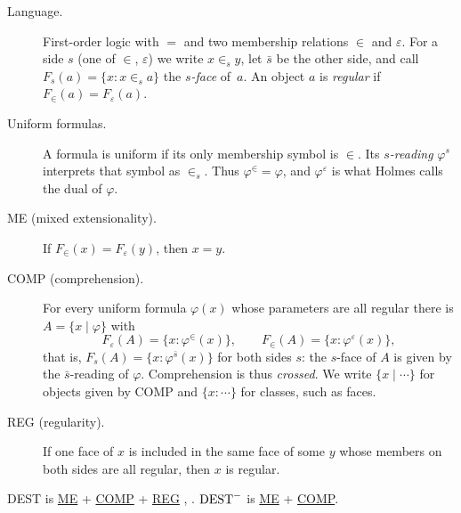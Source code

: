 \documentclass[11pt,a4paper]{article}
\theoremstyle{definition}
\theoremstyle{remark}
\newcommand{\eps}{\varepsilon}
\newcommand{\os}{\bar s}
\newcommand{\ME}{\textup{ME}}
\newcommand{\COMP}{\textup{COMP}}
\newcommand{\REG}{\textup{REG}}
\newcommand{\DEST}{\textup{DEST}}
\newcommand{\DESTm}{\ensuremath{\textup{DEST}^{-}}}
\begin{document}
\begin{description}
\item[Language.] First-order logic with $=$ and two membership relations $\in$ and $\eps$. For a side $s$ (one of ${\in}$, ${\eps}$) we write $x \in_s y$, let $\os$ be the other side, and call \mbox{$F_s(a) = \{x : x \in_s a\}$} the \emph{$s$-face} of~$a$. An object $a$ is \emph{regular} if $F_{\in}(a) = F_{\eps}(a)$.
\item[Uniform formulas.] A formula is uniform if its only membership symbol is $\in$. Its \emph{$s$-reading} $\varphi^s$ interprets that symbol as $\in_s$. Thus $\varphi^{\in} = \varphi$, and $\varphi^{\eps}$ is what Holmes calls the dual of $\varphi$.
\item[\ME{} (mixed extensionality).]\label{ax:ME} If $F_{\in}(x) = F_{\eps}(y)$, then $x = y$.
\item[\COMP{} (comprehension).]\label{ax:COMP} For every uniform formula $\varphi(x)$ whose parameters are all regular there is \mbox{$A = \{x \mid \varphi\}$} with
\[
  F_{\eps}(A) = \{x : \varphi^{\in}(x)\}, \qquad F_{\in}(A) = \{x : \varphi^{\eps}(x)\},
\]
that is, $F_s(A) = \{x : \varphi^{\os}(x)\}$ for both sides $s$: the $s$-face of $A$ is given by the $\os$-reading of $\varphi$. Comprehension is thus \emph{crossed}. We write $\{x \mid \cdots\}$ for objects given by \COMP{} and $\{x : \cdots\}$ for classes, such as faces.
\item[\REG{} (regularity).]\label{ax:REG} If one face of $x$ is included in the same face of some $y$ whose members on both sides are all regular, then $x$ is regular.
\end{description}

\noindent \DEST{} is {\hyperref[ax:ME]{\ME}}{} + {\hyperref[ax:COMP]{\COMP}}{} + {\hyperref[ax:REG]{\REG}}{} \cite[\S2]{H05}, \cite[\S8.1]{HFL}. \DESTm{} is {\hyperref[ax:ME]{\ME}}{} + {\hyperref[ax:COMP]{\COMP}}.
\end{document}
